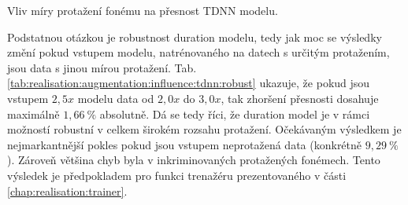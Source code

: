 \begin{table}[htpb]
  \centering
  \def\arraystretch{1.5}
  \caption{Vliv míry protažení fonému na přesnost TDNN modelu.}
  \label{tab:realisation:augmentation:influence:tdnn}
\end{table}

Podstatnou otázkou je robustnost duration modelu, tedy jak moc se výsledky změní pokud vstupem modelu, natrénovaného na datech s určitým protažením, jsou data s jinou mírou protažení. Tab. \ref{tab:realisation:augmentation:influence:tdnn:robust} ukazuje, že pokud jsou vstupem $2,5x$ modelu data od $2,0x$ do $3,0x$, tak zhoršení přesnosti dosahuje maximálně $1,66\ \%$ absolutně. Dá se tedy říci, že duration model je v rámci možností robustní v celkem širokém rozsahu protažení. Očekávaným výsledkem je nejmarkantnější pokles pokud jsou vstupem neprotažená data (konkrétně $9,29\ \%$). Zároveň většina chyb byla v inkriminovaných protažených fonémech. Tento výsledek je předpokladem pro funkci trenažéru prezentovaného v části \ref{chap:realisation:trainer}.

